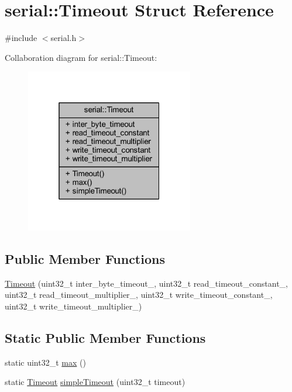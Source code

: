 \hypertarget{structserial_1_1_timeout}{}\section{serial\+:\+:Timeout Struct Reference}
\label{structserial_1_1_timeout}


{\ttfamily \#include $<$serial.\+h$>$}



Collaboration diagram for serial\+:\+:Timeout\+:\nopagebreak
\begin{figure}[H]
\begin{center}
\leavevmode
\includegraphics[width=208pt]{structserial_1_1_timeout__coll__graph}
\end{center}
\end{figure}
\subsection*{Public Member Functions}
\begin{DoxyCompactItemize}
\item 
\mbox{\hyperlink{structserial_1_1_timeout_a1a454b17f5d653b8e1b04b3ec2fead59}{Timeout}} (uint32\+\_\+t inter\+\_\+byte\+\_\+timeout\+\_, uint32\+\_\+t read\+\_\+timeout\+\_\+constant\+\_, uint32\+\_\+t read\+\_\+timeout\+\_\+multiplier\+\_, uint32\+\_\+t write\+\_\+timeout\+\_\+constant\+\_, uint32\+\_\+t write\+\_\+timeout\+\_\+multiplier\+\_)
\end{DoxyCompactItemize}
\subsection*{Static Public Member Functions}
\begin{DoxyCompactItemize}
\item 
static uint32\+\_\+t \mbox{\hyperlink{structserial_1_1_timeout_adc68e33d2f94bfa33ba1062c363b9151}{max}} ()
\item 
static \mbox{\hyperlink{structserial_1_1_timeout}{Timeout}} \mbox{\hyperlink{structserial_1_1_timeout_aa4fbd72e16f47c9aea9fb3c32ca17828}{simple\+Timeout}} (uint32\+\_\+t timeout)
\end{DoxyCompactItemize}
